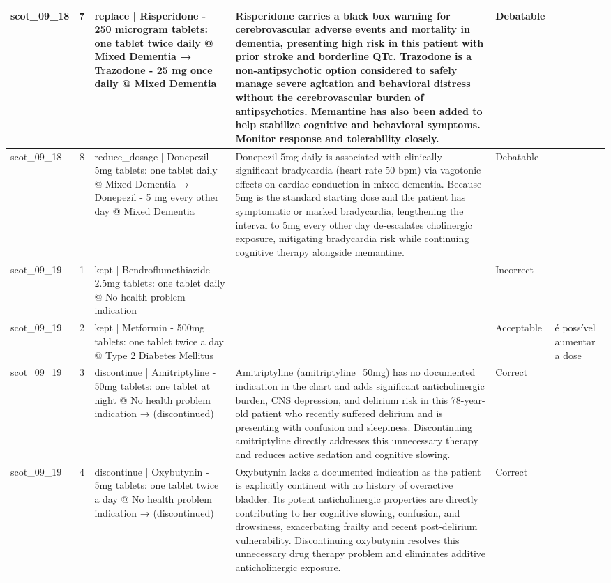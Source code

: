 \begin{longtable}{|p{1.45cm}|c|p{3.3cm}|p{6.5cm}|p{1.55cm}|p{2.3cm}|}
\hline
scot\_09\_18 & 7 & replace | Risperidone - 250 microgram tablets: one tablet twice daily @ Mixed Dementia → Trazodone - 25 mg once daily @ Mixed Dementia & Risperidone carries a black box warning for cerebrovascular adverse events and mortality in dementia, presenting high risk in this patient with prior stroke and borderline QTc. Trazodone is a non-antipsychotic option considered to safely manage severe agitation and behavioral distress without the cerebrovascular burden of antipsychotics. Memantine has also been added to help stabilize cognitive and behavioral symptoms. Monitor response and tolerability closely. & Debatable &  \\
\hline
scot\_09\_18 & 8 & reduce\_dosage | Donepezil - 5mg tablets: one tablet daily @ Mixed Dementia → Donepezil - 5 mg every other day @ Mixed Dementia & Donepezil 5mg daily is associated with clinically significant bradycardia (heart rate 50 bpm) via vagotonic effects on cardiac conduction in mixed dementia. Because 5mg is the standard starting dose and the patient has symptomatic or marked bradycardia, lengthening the interval to 5mg every other day de-escalates cholinergic exposure, mitigating bradycardia risk while continuing cognitive therapy alongside memantine. & Debatable &  \\
\hline
scot\_09\_19 & 1 & kept | Bendroflumethiazide - 2.5mg tablets: one tablet daily @ No health problem indication &  & Incorrect &  \\
\hline
scot\_09\_19 & 2 & kept | Metformin - 500mg tablets: one tablet twice a day @ Type 2 Diabetes Mellitus &  & Acceptable & é possível aumentar a dose \\
\hline
scot\_09\_19 & 3 & discontinue | Amitriptyline - 50mg tablets: one tablet at night @ No health problem indication → (discontinued) & Amitriptyline (amitriptyline\_50mg) has no documented indication in the chart and adds significant anticholinergic burden, CNS depression, and delirium risk in this 78-year-old patient who recently suffered delirium and is presenting with confusion and sleepiness. Discontinuing amitriptyline directly addresses this unnecessary therapy and reduces active sedation and cognitive slowing. & Correct &  \\
\hline
scot\_09\_19 & 4 & discontinue | Oxybutynin - 5mg tablets: one tablet twice a day @ No health problem indication → (discontinued) & Oxybutynin lacks a documented indication as the patient is explicitly continent with no history of overactive bladder. Its potent anticholinergic properties are directly contributing to her cognitive slowing, confusion, and drowsiness, exacerbating frailty and recent post-delirium vulnerability. Discontinuing oxybutynin resolves this unnecessary drug therapy problem and eliminates additive anticholinergic exposure. & Correct &  \\

\end{longtable}
